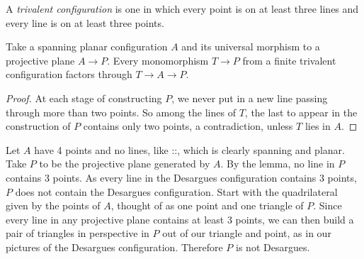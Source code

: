 A \emph{trivalent configuration} is one in which every point is on at least three lines and every line is on at least three points.

\begin{lemma}
Take a spanning planar configuration \(A\) and its universal morphism to a projective plane \(A \to P\).
Every monomorphism \(T \to P\) from a finite trivalent configuration factors through \(T \to A \to P\).
\end{lemma}
\begin{proof}
At each stage of constructing \(P\), we never put in a new line passing through more than two points.
So among the lines of \(T\), the last to appear in the construction of \(P\) contains only two points, a contradiction, unless \(T\) lies in \(A\).
\end{proof}

\begin{example}
Let \(A\) have 4 points and no lines, like ::, which is clearly spanning and planar. 
Take \(P\) to be the projective plane generated by \(A\).
By the lemma, no line in \(P\) contains 3 points.
As every line in the Desargues configuration contains 3 points, \(P\) does not contain the Desargues configuration.
Start with the quadrilateral given by the points of \(A\), thought of as one point and one triangle of \(P\).
Since every line in any projective plane contains at least 3 points, we can then build a pair of triangles in perspective in \(P\) out of our triangle and point, as in our pictures of the Desargues configuration.
Therefore \(P\) is not Desargues. 
\end{example}

